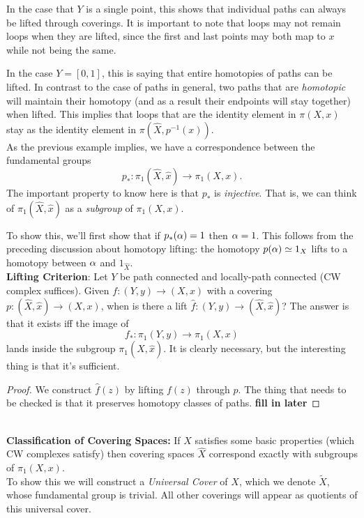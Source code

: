 \documentclass{amsart}
\begin{document}
	 In the case that $Y$ is a single point, this shows that individual paths can always be lifted through coverings. It is important to note that loops may not remain loops when they are lifted, since the first and last points may both map to $x$ while not being the same.
	 
	 In the case $Y=[0,1]$, this is saying that entire homotopies of paths can be lifted. In contrast to the case of paths in general, two paths that are \textit{homotopic} will maintain their homotopy (and as a result their endpoints will stay together) when lifted. This implies that loops that are the identity element in $\pi(X,x)$ stay as the identity element in $\pi(\hat{X},p^{-1}(x))$.\\
	 
	 As the previous example implies, we have a correspondence between the fundamental groups
	 $$
	 p_*: \pi_1(\hat{X},\hat{x}) \to \pi_1(X,x).
	 $$	 
	 The important property to know here is that $p_*$ is \textit{injective}. That is, we can think of $\pi_1(\hat{X},\hat{x})$ as a \textit{subgroup} of $\pi_1(X,x)$.
	 
	 To show this, we'll first show that if $p_*(\alpha)=1$ then $\alpha=1$. This follows from the preceding discussion about homotopy lifting: the homotopy $p(\alpha)\simeq 1_X$ lifts to a homotopy between $\alpha$ and $1_{\hat{X}}$.\\
	 
	 \textbf{Lifting Criterion}: Let $Y$ be path connected and locally-path connected (CW complex suffices). Given $f:(Y,y)\to (X,x)$ with a covering $p:(\hat{X},\hat{x})\to (X,x)$, when is there a lift $\hat{f}:(Y,y)\to (\hat{X},\hat{x})$? The answer is that it exists iff the image of 
	 $$f_*:\pi_1(Y,y)\to \pi_1(X,x)$$
	 lands inside the subgroup $\pi_1(\hat{X},\hat{x})$. It is clearly necessary, but the interesting thing is that it's sufficient.
	 
	 \begin{proof}
	 	We construct $\hat{f}(z)$ by lifting $f(z)$ through $p$. The thing that needs to be checked is that it preserves homotopy classes of paths. \textbf{fill in later} 
	 \end{proof}\\
	 
	 \textbf{Classification of Covering Spaces:} If $X$ satisfies some basic properties (which CW complexes satisfy) then covering spaces $\hat{X}$ correspond exactly with subgroups of $\pi_1(X,x)$.\\
	 
	 To show this we will construct a \textit{Universal Cover} of $X$, which we denote $\tilde{X}$, whose fundamental group is trivial. All other coverings will appear as quotients of this universal cover.
	 
\end{document}
